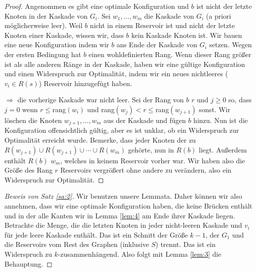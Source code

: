 \documentclass[12pt,a4paper]{scrartcl}
\numberwithin{equation}{section} %
\theoremstyle{definition}
\theoremstyle{plain}
\begin{document}
\begin{proof}
Angenommen es gibt eine optimale Konfiguration und $b$ ist nicht der letzte Knoten in der Kaskade von $G_i$. Sei $w_1,\dotsc, w_m$ die Kaskade von $G_i$ (a priori möglicherweise leer). Weil $b$ nicht in einem Reservoir ist und nicht der letzte Knoten einer Kaskade, wissen wir, dass $b$ kein Kaskade Knoten ist. Wir bauen eine neue Konfiguration indem wir $b$ ans Ende der Kaskade von $G_i$ setzen. Wegen der ersten Bedingung hat $b$ einen wohldefinierten Rang. Wenn dieser Rang größer ist als alle anderen Ränge in der Kaskade, haben wir eine gültige Konfiguration und einen Widerspruch zur Optimalität, indem wir ein neues nichtleeres ($v_i\in R(s)$) Reservoir hinzugefügt haben. \par $\Rightarrow$ die vorherige Kaskade war nicht leer. Sei der Rang von $b$ $r$ und $j\ge 0$ so, dass $j=0$ wenn $r\le$rang$(w_i)$ und rang$(w_j)<r\le$rang$(w_{j+1})$ sonst. Wir löschen die Knoten $w_{j+1},\dotsc,w_m$ aus der Kaskade und fügen $b$ hinzu. Nun ist die Konfiguration offensichtlich gültig, aber es ist unklar, ob ein Widerspruch zur Optimalität erreicht wurde. Bemerke, dass jeder Knoten der zu $R(w_{j+1})\cup R(w_{j+1})\cup\dotsb\cup R(w_m)$ gehörte, nun in $R(b)$ liegt. Außerdem enthält $R(b)$ $w_m$, welches in keinem Reservoir vorher war. Wir haben also die Größe des Rang $r$ Reservoirs vergrößert ohne andere zu verändern, also ein Widerspruch zur Optimalität.
\end{proof}
\begin{proof}[Beweis von Satz \ref{sa:2}]
Wir benutzen unsere Lemmata. Daher können wir also annehmen, dass wir eine optimale Konfiguration haben, die keine Brücken enthält und in der alle Kanten wir in Lemma \ref{lem:4} am Ende ihrer Kaskade liegen. Betrachte die Menge, die die letzten Knoten in jeder nicht-leeren Kaskade und $v_i$ für jede leere Kaskade enthält. Das ist ein Schnitt der Größe $k-1$, der $G_1$ und die Reservoirs vom Rest des Graphen (inklusive $S$) trennt. Das ist ein Widerspruch zu $k$-zusammenhängend. Also folgt mit Lemma \ref{lem:3} die Behauptung.
\end{proof}
\end{document}
